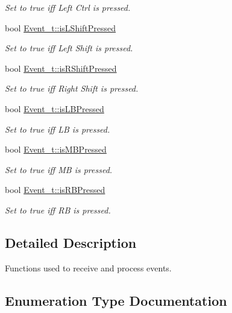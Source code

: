 \begin{DoxyCompactItemize}
\begin{DoxyCompactList}\small\item\em Set to true iff Left Ctrl is pressed. \end{DoxyCompactList}\item 
bool \mbox{\hyperlink{group__event_gad1fa4519784799da6a38747199ff898f}{Event\+\_\+t\+::is\+L\+Shift\+Pressed}}
\begin{DoxyCompactList}\small\item\em Set to true iff Left Shift is pressed. \end{DoxyCompactList}\item 
bool \mbox{\hyperlink{group__event_ga63dc7ccca6afe5c67f51147f763e851d}{Event\+\_\+t\+::is\+R\+Shift\+Pressed}}
\begin{DoxyCompactList}\small\item\em Set to true iff Right Shift is pressed. \end{DoxyCompactList}\item 
bool \mbox{\hyperlink{group__event_ga6bd25b846a78fabf96eaa267cdead1a0}{Event\+\_\+t\+::is\+L\+B\+Pressed}}
\begin{DoxyCompactList}\small\item\em Set to true iff LB is pressed. \end{DoxyCompactList}\item 
bool \mbox{\hyperlink{group__event_ga736bfa60cc90cc6f8e11fb555520545e}{Event\+\_\+t\+::is\+M\+B\+Pressed}}
\begin{DoxyCompactList}\small\item\em Set to true iff MB is pressed. \end{DoxyCompactList}\item 
bool \mbox{\hyperlink{group__event_ga82fc1d867f7a90159e8b05cba5e5ee96}{Event\+\_\+t\+::is\+R\+B\+Pressed}}
\begin{DoxyCompactList}\small\item\em Set to true iff RB is pressed. \end{DoxyCompactList}\end{DoxyCompactItemize}


\subsection{Detailed Description}
Functions used to receive and process events. 

\subsection{Enumeration Type Documentation}
\mbox{\label{group__event_ga65afc57ec37493fc7409f26a189ab104}} 
